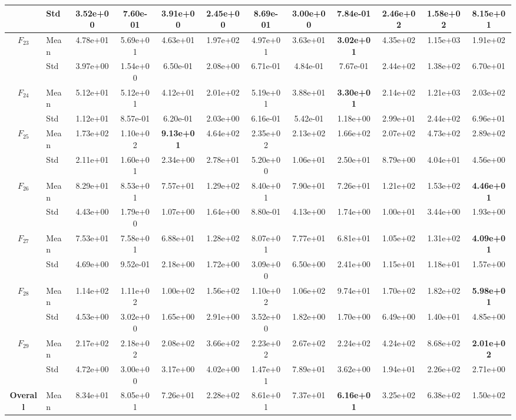 \begin{center}
\begin{longtable}{clcccccccccc}
 & Std & 3.52e+00 & 7.60e-01 & 3.91e+00 & 2.45e+00 & 8.69e-01 & 3.00e+00 & 7.84e-01 & 2.46e+02 & 1.58e+02 & 8.15e+01 \\
\midrule
$F_{23}$ & Mean & 4.78e+01 & 5.69e+01 & 4.63e+01 & 1.97e+02 & 4.97e+01 & 3.63e+01 & \textbf{3.02e+01} & 4.35e+02 & 1.15e+03 & 1.91e+02 \\
 & Std & 3.97e+00 & 1.54e+00 & 6.50e-01 & 2.08e+00 & 6.71e-01 & 4.84e-01 & 7.67e-01 & 2.44e+02 & 1.38e+02 & 6.70e+01 \\
\midrule
$F_{24}$ & Mean & 5.12e+01 & 5.12e+01 & 4.12e+01 & 2.01e+02 & 5.19e+01 & 3.88e+01 & \textbf{3.30e+01} & 2.14e+02 & 1.21e+03 & 2.03e+02 \\
 & Std & 1.12e+01 & 8.57e-01 & 6.20e-01 & 2.03e+00 & 6.16e-01 & 5.42e-01 & 1.18e+00 & 2.99e+01 & 2.44e+02 & 6.96e+01 \\
\midrule
$F_{25}$ & Mean & 1.73e+02 & 1.10e+02 & \textbf{9.13e+01} & 4.64e+02 & 2.35e+02 & 2.13e+02 & 1.66e+02 & 2.07e+02 & 4.73e+02 & 2.89e+02 \\
 & Std & 2.11e+01 & 1.60e+01 & 2.34e+00 & 2.78e+01 & 5.20e+00 & 1.06e+01 & 2.50e+01 & 8.79e+00 & 4.04e+01 & 4.56e+00 \\
\midrule
$F_{26}$ & Mean & 8.29e+01 & 8.53e+01 & 7.57e+01 & 1.29e+02 & 8.40e+01 & 7.90e+01 & 7.26e+01 & 1.21e+02 & 1.53e+02 & \textbf{4.46e+01} \\
 & Std & 4.43e+00 & 1.79e+00 & 1.07e+00 & 1.64e+00 & 8.80e-01 & 4.13e+00 & 1.74e+00 & 1.00e+01 & 3.44e+00 & 1.93e+00 \\
\midrule
$F_{27}$ & Mean & 7.53e+01 & 7.58e+01 & 6.88e+01 & 1.28e+02 & 8.07e+01 & 7.77e+01 & 6.81e+01 & 1.05e+02 & 1.31e+02 & \textbf{4.09e+01} \\
 & Std & 4.69e+00 & 9.52e-01 & 2.18e+00 & 1.72e+00 & 3.09e+00 & 6.50e+00 & 2.41e+00 & 1.15e+01 & 1.18e+01 & 1.57e+00 \\
\midrule
$F_{28}$ & Mean & 1.14e+02 & 1.11e+02 & 1.00e+02 & 1.56e+02 & 1.10e+02 & 1.06e+02 & 9.74e+01 & 1.70e+02 & 1.82e+02 & \textbf{5.98e+01} \\
 & Std & 4.53e+00 & 3.02e+00 & 1.65e+00 & 2.91e+00 & 3.52e+00 & 1.82e+00 & 1.70e+00 & 6.49e+00 & 1.40e+01 & 4.85e+00 \\
\midrule
$F_{29}$ & Mean & 2.17e+02 & 2.18e+02 & 2.08e+02 & 3.66e+02 & 2.23e+02 & 2.67e+02 & 2.24e+02 & 4.24e+02 & 8.68e+02 & \textbf{2.01e+02} \\
 & Std & 4.72e+00 & 3.00e+00 & 3.17e+00 & 4.02e+00 & 1.47e+01 & 7.89e+01 & 3.62e+00 & 1.94e+01 & 2.26e+02 & 2.71e+00 \\
\midrule
\textbf{Overall} & Mean & 8.34e+01 & 8.05e+01 & 7.26e+01 & 2.28e+02 & 8.61e+01 & 7.37e+01 & \textbf{6.16e+01} & 3.25e+02 & 6.38e+02 & 1.50e+02 \\
\bottomrule
\end{longtable}
\end{center}